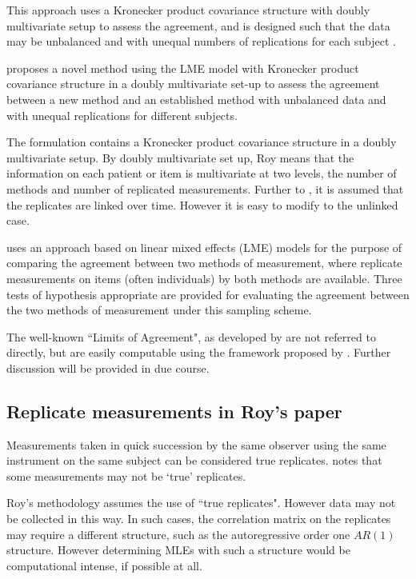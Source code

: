 \documentclass[12pt, a4paper]{report}
\theoremstyle{plain}
\theoremstyle{definition}
\theoremstyle{remark}
\begin{document}
	This approach uses a Kronecker product covariance structure with doubly multivariate setup to
	assess the agreement, and is designed such that the data may be unbalanced and with unequal numbers of replications for each subject \citep{ARoy2009}.
	
		\citet{ARoy2009} proposes a novel method using the LME model with Kronecker product covariance structure in a doubly multivariate set-up to assess the agreement between a new method and an established method with unbalanced data and with unequal replications for different subjects.
		
	
	The formulation contains a Kronecker product covariance structure in a doubly multivariate setup. By doubly multivariate set up, Roy means that the information on each patient or item is multivariate at two levels, the number of methods and number of replicated measurements. Further to \citet{lam}, it is assumed that the replicates are linked over time. However it is easy to modify to the unlinked case.
	
		
		
	\citet{ARoy2009} uses an approach based on linear mixed effects (LME) models for the purpose of comparing the agreement between two methods of measurement, where replicate measurements on items (often individuals) by both methods are available. Three tests of hypothesis appropriate are provided for evaluating the agreement between the two methods of measurement under this sampling scheme. 
	

	
	

	
	

	
	The well-known ``Limits of Agreement", as developed by \citet{BA86} are not referred to directly, but are easily computable using the framework proposed by \citet{ARoy2009}. Further discussion will be provided in due course.	
	
	\subsection{Replicate measurements in Roy's paper}
	Measurements taken in quick succession by the same observer using the same instrument on the same subject can be considered true replicates. \citet{ARoy2009} notes that some measurements may not be `true' replicates.
	
	Roy's methodology assumes the use of ``true replicates". However data may not be collected in this way. In such cases, the correlation matrix on the replicates may require a different structure, such as the autoregressive order one $AR(1)$ structure. However determining MLEs with such a structure would be computational intense, if possible at all.
	
\end{document}
